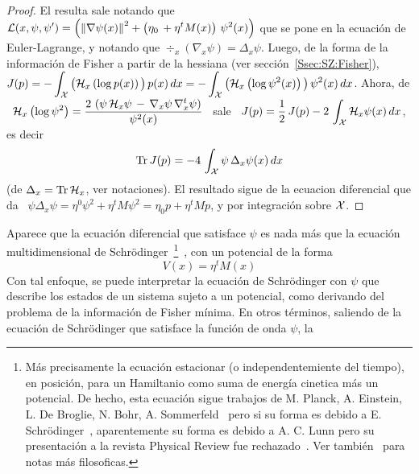 \begin{proof}
El   resulta  sale   notando   que   $\displaystyle  \mathcal{L}(x   ,   \psi  ,   \psi')
  =  \left( \left\|  \nabla  \psi(x)  \right\|^2 +  \left(  \eta_0  \, +  \eta^t
  M(x)  \right)  \,  \psi^2(x)  \right)$  que   se  pone  en  la  ecuaci\'on  de
  Euler-Lagrange,   y   notando   que    $\div_x\left(   \nabla_x   \psi   \right)
  = \Delta_x \psi$.  \newline Luego, de la  forma de la informaci\'on  de Fisher a
  partir  de la  hessiana  (ver secci\'on~\ref{Ssec:SZ:Fisher}),  $\displaystyle
  J(p) = - \int_{\mathcal{X}} \big( \mathcal{H}_x \left( \log  p(x) \right) \big) \, p(x) \, dx =
  - \int_{\mathcal{X}} \big(  \mathcal{H}_x \left( \log  \psi^2(x) \right) \big) \,  \psi^2(x) \,
  dx$.   Ahora,  de   \  $\displaystyle  \mathcal{H}_x  \left(   \log  \psi^2  \right)
  =     \frac{2      \,     \left(      \psi     \,     \mathcal{H}_x      \psi     \,
  - \,  \nabla_x  \psi   \,  \nabla_x^t  \psi  \right)}{\psi^2(x)}$   \  sale  \
  $\displaystyle J(p) = \frac12  \, J(p) - 2 \, \int_{\mathcal{X}}  \mathcal{H}_x \psi(x) \, dx$,
  es decir
%
\[
\operatorname{Tr} J(p) = - 4 \, \int_{\mathcal{X}} \psi \, \Delta_x \psi(x) \, dx
\]
%
(de $\Delta_x =  \operatorname{Tr} \mathcal{H}_x$, ver notaciones). El resultado  sigue de la ecuacion
diferencial  que da  \ $\psi  \Delta_x  \psi =  \eta^0  \psi^2 +  \eta^t M  \psi^2
= \eta_0 p + \eta^t M p$, y por integraci\'on sobre $\mathcal{X}$.
\end{proof}
%
Aparece que la ecuaci\'on diferencial que  satisface $\psi$ es nada m\'as que la
ecuaci\'on  multidimensional  de Schr\"odinger~\footnote{M\'as  precisamente  la
ecuaci\'on estacionar (o independentemiente del  tiempo), en posici\'on, para un
Hamiltanio como  suma de energ\'ia cinetica  m\'as un potencial. De  hecho, esta
ecuaci\'on sigue trabajos de M.  Planck, A. Einstein, L. De Broglie, N. Bohr, A.
Sommerfeld~\cite{Bro25}    pero    si    su     forma    es    debido    a    E.
Schr\"odinger~\cite{Sch26, Moo17},  aparentemente su  forma es  debido a  A.  C.
Lunn   pero   su    presentaci\'on   a   la   revista    Physical   Review   fue
rechazado~\cite{Kam85, WeiWei97, WeiIli08}.  Ver tambi\'en~\cite{Sch51, Sch92,
Sch14}  para  notas  m\'as filosoficas.}~\cite{Dir58,  Bay73,  LerTri91,  Omn94,
Gri05}, con un potencial de la forma
%
\[
V(x) =  \eta^t M(x)
\]
%
Con tal enfoque, se puede interpretar  la ecuaci\'on de Schr\"odinger con $\psi$
que describe los estados de un sistema sujeto a un potencial, como derivando del
problema de la informaci\'on de  Fisher m\'inima.  En otros t\'erminos, saliendo
de la ecuaci\'on de Schr\"odinger que  satisface la funci\'on de onda $\psi$, la
